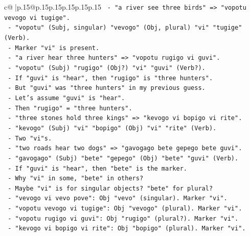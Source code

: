 \documentclass{article}
\begin{document}
{\begin{supertabular}{c@{$\;$}|p{.15\linewidth}@{}p{.15\linewidth}p{.15\linewidth}p{.15\linewidth}p{.15\linewidth}p{.15\linewidth}}
{{{\texttt{              {-} "a river see three birds" => "vopotu vevogo vi tugige".} \\
\texttt{                {-} "vopotu" (Subj, singular) "vevogo" (Obj, plural) "vi" "tugige" (Verb).} \\
\texttt{                {-} Marker "vi" is present.} \\
\texttt{              {-} "a river hear three hunters" => "vopotu rugigo vi guvi".} \\
\texttt{                {-} "vopotu" (Subj) "rugigo" (Obj?) "vi" "guvi" (Verb?).} \\
\texttt{                {-} If "guvi" is "hear", then "rugigo" is "three hunters".} \\
\texttt{                {-} But "guvi" was "three hunters" in my previous guess.} \\
\texttt{                {-} Let's assume "guvi" is "hear".} \\
\texttt{                {-} Then "rugigo" = "three hunters".} \\
\texttt{                {-} "three stones hold three kings" => "kevogo vi bopigo vi rite".} \\
\texttt{                  {-} "kevogo" (Subj) "vi" "bopigo" (Obj) "vi" "rite" (Verb).} \\
\texttt{                  {-} Two "vi"s.} \\
\texttt{                {-} "two roads hear two dogs" => "gavogago bete gepego bete guvi".} \\
\texttt{                  {-} "gavogago" (Subj) "bete" "gepego" (Obj) "bete" "guvi" (Verb).} \\
\texttt{                  {-} If "guvi" is "hear", then "bete" is the marker.} \\
\texttt{                  {-} Why "vi" in some, "bete" in others?} \\
\texttt{                  {-} Maybe "vi" is for singular objects? "bete" for plural?} \\
\texttt{                  {-} "vevogo vi vevo pove": Obj "vevo" (singular). Marker "vi".} \\
\texttt{                  {-} "vopotu vevogo vi tugige": Obj "vevogo" (plural). Marker "vi".} \\
\texttt{                  {-} "vopotu rugigo vi guvi": Obj "rugigo" (plural?). Marker "vi".} \\
\texttt{                  {-} "kevogo vi bopigo vi rite": Obj "bopigo" (plural). Marker "vi".} \\
}}}
\end{supertabular}}
\end{document}
